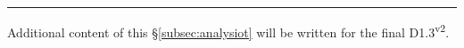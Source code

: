 \bigskip

\hrule

\medskip

Additional content of this \S\ref{subsec:analysiot} will be written for the final D1.3\textsuperscript{v2}.


